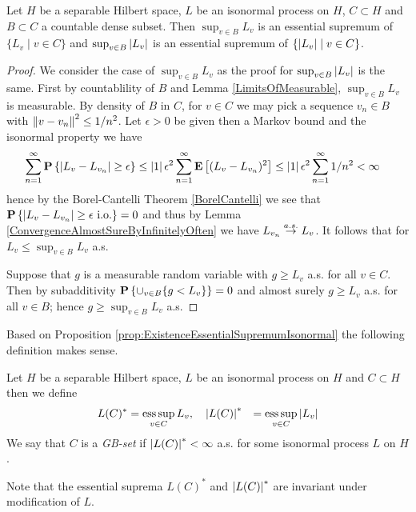 \begin{prop}\label{prop:ExistenceEssentialSupremumIsonormal}Let $H$ be a separable Hilbert space, $L$ be an isonormal process on $H$, $C \subset H$ and $B \subset C$ a  countable dense subset.  Then $\sup_{v \in B} L_v$ is an essential supremum of $\lbrace L_v \mid v \in C \rbrace$ and $\sup_{v \in B} \left \vert L_v \right \vert$ is an essential supremum of $\lbrace \left \vert L_v \right \vert \mid v \in C \rbrace$.
\end{prop}
\begin{proof}
We consider the case of $\sup_{v \in B} L_v$ as the proof for $\sup_{v \in B} \left \vert L_v \right \vert$ is the same.  First by countablility of $B$ and Lemma \ref{LimitsOfMeasurable}, $\sup_{v \in B} L_v$ is measurable. By density of $B$ in $C$, for $v \in C$ we may pick a sequence $v_n \in B$ with $\left \lVert v - v_n \right \rVert^2 \leq 1/n^2$.  Let $\epsilon > 0$ be
given then a Markov bound and the isonormal property we have
\begin{align*}
\sum_{n =1}^\infty \textbf{P}\left \{\left \vert L_{v} - L_{v_n} \right \vert \geq \epsilon \right \} &\leq \left \vert 1 \right \vert{\epsilon^2} \sum_{n =1}^\infty \textbf{E}\left[(L_v - L_{v_n})^2\right] \leq \left \vert 1 \right \vert{\epsilon^2} \sum_{n =1}^\infty 1/n^2 < \infty
\end{align*}
hence by the Borel-Cantelli Theorem \ref{BorelCantelli} we see that $\textbf{P}\left \{\left \vert L_{v} - L_{v_n} \right \vert \geq \epsilon \text{ i.o.} \right \} = 0$ and thus by Lemma \ref{ConvergenceAlmostSureByInfinitelyOften} we have $L_{v_n} \overset{a.s.}\to L_v$.  It follows that for $L_v \leq \sup_{v \in B} L_v$ a.s.

Suppose that $g$ is a measurable random variable with $g \geq L_v$ a.s. for all $v \in C$.  Then by subadditivity $\textbf{P}\left \{\cup_{v \in B} \lbrace g < L_v \rbrace \right \}=0$ and almost surely $g \geq L_v$ a.s. for all $v \in B$; hence $g \geq \sup_{v \in B} L_v$ a.s.  
\end{proof}

Based on Proposition \ref{prop:ExistenceEssentialSupremumIsonormal} the following definition makes sense.
\begin{defn}Let $H$ be a separable Hilbert space, $L$ be an isonormal process on $H$ and $C \subset H$ then we define 
\begin{align*}
L(C)^* &= \operatorname*{ess\,sup}_{v \in C} L_v, &&\left \vert L(C) \right \vert^* &= \operatorname*{ess\,sup}_{v \in C} \left \vert L_v \right \vert
\end{align*}
We say that $C$ is a \emph{GB-set} if $\left \vert L(C) \right \vert^* < \infty$ a.s.  for some isonormal process $L$ on $H$.
\end{defn}

Note that the essential suprema $L(C)^*$ and $\left \vert L(C) \right \vert^*$ are invariant under modification of $L$.

